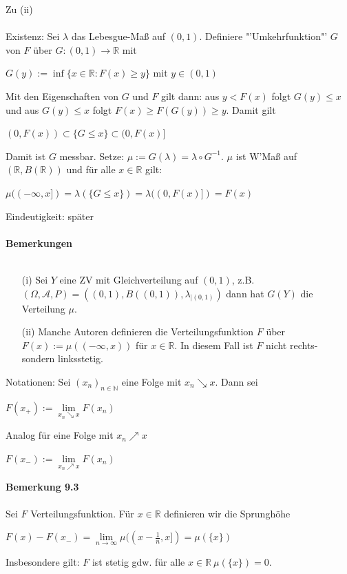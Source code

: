 \documentclass[10pt,a4paper]{report}
\newcommand{\N}{\mathbb{N}}
\newcommand{\R}{\mathbb{R}}
\numberwithin{equation}{section}
\numberwithin{figure}{section}
\theoremstyle{plain}
\theoremstyle{definition}
\theoremstyle{plain}
\theoremstyle{definition}
\theoremstyle{remark}
\theoremstyle{plain}
\begin{document}
Zu (ii)\\\\
Existenz: Sei $\lambda$ das Lebesgue-Maß auf $(0,1)$. Definiere "'Umkehrfunktion"' $G$ von $F$ über $G:(0,1) \to \R$ mit
\begin{center}
$G(y):=\inf\{x \in \R:F(x)\geq y\}$ mit $y \in (0,1)$
\end{center}
Mit den Eigenschaften von $G$ und $F$ gilt dann: aus $y<F(x)$ folgt $G(y)\leq x$ und aus $G(y)\leq x$ folgt $F(x)\geq F(G(y))\geq y$. Damit gilt
\begin{center}
$(0,F(x)) \subset \{G\leq x\}\subset (0,F(x)]$
\end{center}
Damit ist $G$ messbar. Setze: $\mu:=G(\lambda)=\lambda\circ G^{-1}$. $\mu$ ist W'Maß auf $(\R,B(\R))$ und für alle $x \in \R$ gilt:
\begin{center}
$\mu((-\infty,x])=\lambda(\{G\leq x\})=\lambda((0,F(x)])=F(x)$
\end{center} 
Eindeutigkeit: später\\\\
\textbf{Bemerkungen}\\\\
\begin{itemize}
\item[(i)] Sei $Y$ eine ZV mit Gleichverteilung auf $(0,1)$, z.B. $(\Omega,\mathcal{A},P)=((0,1),B((0,1)),\lambda_{|(0,1)})$ dann hat $G(Y)$ die Verteilung $\mu$.
\item[(ii)] Manche Autoren definieren die Verteilungsfunktion $F$ über $F(x):=\mu((-\infty,x))$ für $x \in \R$. In diesem Fall ist $F$ nicht rechts- sondern linksstetig.
\end{itemize}
Notationen: Sei $(x_n)_{n \in \N}$ eine Folge mit $x_n\searrow x$. Dann sei
\begin{center}
$F(x_+):=\lim\limits_{x_n\searrow x} F(x_n)$
\end{center} 
Analog für eine Folge mit $x_n\nearrow x$
\begin{center}
$F(x_-):=\lim\limits_{x_n\nearrow x} F(x_n)$
\end{center}
\textbf{Bemerkung 9.3}\\\\
Sei $F$ Verteilungsfunktion. Für $x \in \R$ definieren wir die Sprunghöhe
\begin{center}
$F(x)-F(x_-)=\lim\limits_{n \to \infty} \mu((x-\frac{1}{n},x])=\mu(\{x\})$
\end{center}
Insbesondere gilt: $F$ ist stetig gdw. für alle $x \in \R ~ \mu(\{x\})=0$.\\\\
\end{document}
